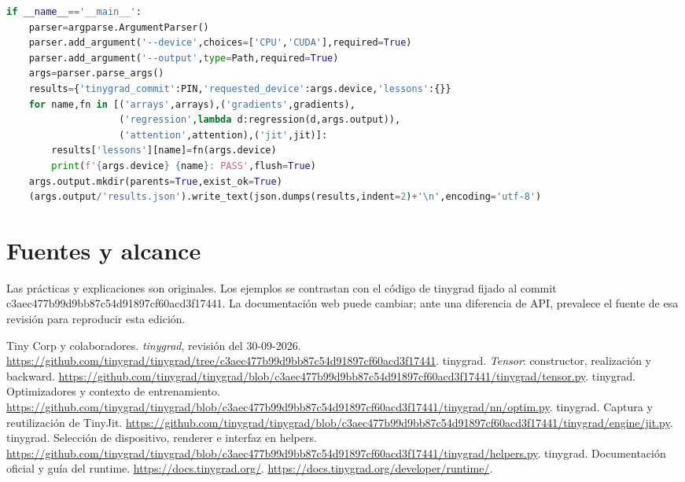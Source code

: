 \documentclass[12pt,a4paper,oneside]{report}
\begin{document}
\begin{lstlisting}[language=Python]
if __name__=='__main__':
    parser=argparse.ArgumentParser()
    parser.add_argument('--device',choices=['CPU','CUDA'],required=True)
    parser.add_argument('--output',type=Path,required=True)
    args=parser.parse_args()
    results={'tinygrad_commit':PIN,'requested_device':args.device,'lessons':{}}
    for name,fn in [('arrays',arrays),('gradients',gradients),
                    ('regression',lambda d:regression(d,args.output)),
                    ('attention',attention),('jit',jit)]:
        results['lessons'][name]=fn(args.device)
        print(f'{args.device} {name}: PASS',flush=True)
    args.output.mkdir(parents=True,exist_ok=True)
    (args.output/'results.json').write_text(json.dumps(results,indent=2)+'\n',encoding='utf-8')

\end{lstlisting}
\chapter{Fuentes y alcance}
Las prácticas y explicaciones son originales. Los ejemplos se contrastan con el código de tinygrad fijado al commit c3aec477b99d9bb87c54d91897cf60acd3f17441. La documentación web puede cambiar; ante una diferencia de API, prevalece el fuente de esa revisión para reproducir esta edición.

\begin{thebibliography}{9}
 Tiny Corp y colaboradores. \emph{tinygrad}, revisión del 30-09-2026. \url{https://github.com/tinygrad/tinygrad/tree/c3aec477b99d9bb87c54d91897cf60acd3f17441}.
 tinygrad. \emph{Tensor}: constructor, realización y backward. \url{https://github.com/tinygrad/tinygrad/blob/c3aec477b99d9bb87c54d91897cf60acd3f17441/tinygrad/tensor.py}.
 tinygrad. Optimizadores y contexto de entrenamiento. \url{https://github.com/tinygrad/tinygrad/blob/c3aec477b99d9bb87c54d91897cf60acd3f17441/tinygrad/nn/optim.py}.
 tinygrad. Captura y reutilización de TinyJit. \url{https://github.com/tinygrad/tinygrad/blob/c3aec477b99d9bb87c54d91897cf60acd3f17441/tinygrad/engine/jit.py}.
 tinygrad. Selección de dispositivo, renderer e interfaz en helpers. \url{https://github.com/tinygrad/tinygrad/blob/c3aec477b99d9bb87c54d91897cf60acd3f17441/tinygrad/helpers.py}.
 tinygrad. Documentación oficial y guía del runtime. \url{https://docs.tinygrad.org/}. \url{https://docs.tinygrad.org/developer/runtime/}.
\end{thebibliography}
\clearpage\renewcommand{\contentsname}{Índice detallado}\tableofcontents
\end{document}
